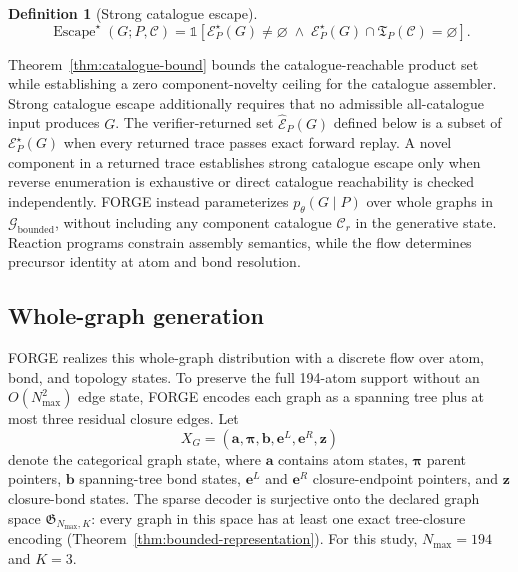 \documentclass{article}
\newtheorem{definition}[theorem]{Definition}
\begin{document}
\begin{definition}[Strong catalogue escape]
\label{def:catalogue-escape}
\begin{equation}
    \operatorname{Escape}^{\star}(G;P,\mathcal C)
    =
    \mathbb{1}\!\left[
        \mathcal E_P^\star(G)\neq\varnothing
        \;\land\;
        \mathcal E_P^\star(G)\cap\mathfrak T_P(\mathcal C)=\varnothing
    \right].
\end{equation}
\end{definition}
Theorem~\ref{thm:catalogue-bound} bounds the catalogue-reachable product set while establishing a
zero component-novelty ceiling for the catalogue assembler.
Strong catalogue escape additionally requires that no admissible all-catalogue input produces $G$.
The verifier-returned set $\widehat{\mathcal E}_P(G)$ defined below is a subset of
$\mathcal E_P^\star(G)$ when every returned trace passes exact forward replay.
A novel component in a returned trace establishes strong catalogue escape only when reverse
enumeration is exhaustive or direct catalogue reachability is checked independently.
FORGE instead parameterizes $p_\theta(G\mid P)$ over whole graphs in
$\mathcal{G}_{\mathrm{bounded}}$, without including any component catalogue $\mathcal{C}_r$ in the
generative state.
Reaction programs constrain assembly semantics, while the flow determines precursor identity at atom
and bond resolution.

\subsection{Whole-graph generation}

FORGE realizes this whole-graph distribution with a discrete flow over atom, bond, and topology
states.
To preserve the full 194-atom support without an $O(N_{\max}^2)$ edge state, FORGE encodes each
graph as a spanning tree plus at most three residual closure edges.
Let
\begin{equation}
    X_G=
    \left(
        \mathbf{a},
        \boldsymbol{\pi},
        \mathbf{b},
        \mathbf{e}^{L},
        \mathbf{e}^{R},
        \mathbf{z}
    \right)
\end{equation}
denote the categorical graph state, where $\mathbf{a}$ contains atom states, $\boldsymbol{\pi}$
parent pointers, $\mathbf{b}$ spanning-tree bond states, $\mathbf{e}^{L}$ and $\mathbf{e}^{R}$
closure-endpoint pointers, and $\mathbf{z}$ closure-bond states.
The sparse decoder is surjective onto the declared graph space
$\mathfrak{G}_{N_{\max},K}$: every graph in this space has at least one exact tree-closure encoding
(Theorem~\ref{thm:bounded-representation}).
For this study, $N_{\max}=194$ and $K=3$.
\end{document}
